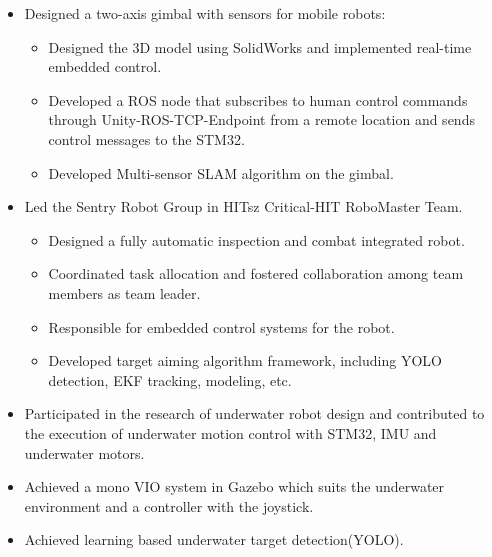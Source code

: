 \documentclass[11pt,a4paper]{moderncv}        %
\begin{document}
%
{
\begin{itemize}%
\item Designed a two-axis gimbal with sensors for mobile robots:
\begin{itemize}%
\item Designed the 3D model using SolidWorks and implemented real-time embedded control.
\item Developed a ROS node that subscribes to human control commands through Unity-ROS-TCP-Endpoint from a remote location and sends control messages to the STM32.
\item Developed Multi-sensor SLAM algorithm on the gimbal.  
\end{itemize}
\end{itemize}
}

%
{
\begin{itemize}%
\item Led the Sentry Robot Group in HITsz Critical-HIT RoboMaster Team.
\begin{itemize}
\item Designed a fully automatic inspection and combat integrated robot.
\item Coordinated task allocation and fostered collaboration among team members as team leader.
\item Responsible for embedded control systems for the robot. 
\item Developed target aiming algorithm framework, including YOLO detection, EKF tracking, modeling, etc.
\end{itemize}
\end{itemize}
}

%
{
\begin{itemize}%
    \item Participated in the research of underwater robot design and contributed to the execution of underwater motion control with STM32, IMU and underwater motors.
    \item Achieved a mono VIO system in Gazebo which suits the underwater environment and a controller with the joystick.
    \item Achieved learning based underwater target detection(YOLO).
\end{itemize}
}
%
{}
\end{document}
